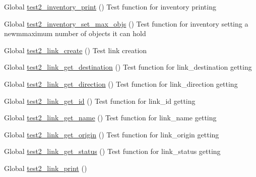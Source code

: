 \begin{DoxyRefList}
\item[Global \mbox{\hyperlink{inventory__test_8c_ab416dcaf2ae0f9852a8c6ed5eea4f408}{test2\+\_\+inventory\+\_\+print}} ()]\label{test__test000439}%
%
Test function for inventory printing  
\item[Global \mbox{\hyperlink{inventory__test_8c_a64fb028724693b382de7a1d9d61604e1}{test2\+\_\+inventory\+\_\+set\+\_\+max\+\_\+objs}} ()]\label{test__test000445}%
%
Test function for inventory setting a newmmaximum number of objects it can hold  
\item[Global \mbox{\hyperlink{link__test_8c_a24b5463da176c3e578b0a0fa8bb1f9f0}{test2\+\_\+link\+\_\+create}} ()]\label{test__test000447}%
%
Test link creation  
\item[Global \mbox{\hyperlink{link__test_8c_a8db6596d19305a9814a963a81d0d32d9}{test2\+\_\+link\+\_\+get\+\_\+destination}} ()]\label{test__test000465}%
%
Test function for link\+\_\+destination getting  
\item[Global \mbox{\hyperlink{link__test_8c_a63dbcd55ed0913dea30eba35884b5558}{test2\+\_\+link\+\_\+get\+\_\+direction}} ()]\label{test__test000467}%
%
Test function for link\+\_\+direction getting  
\item[Global \mbox{\hyperlink{link__test_8c_a0f967a1782dd7264e73ad428d22d125d}{test2\+\_\+link\+\_\+get\+\_\+id}} ()]\label{test__test000450}%
%
Test function for link\+\_\+id getting  
\item[Global \mbox{\hyperlink{link__test_8c_a4efc6cfcdc210e2803f9d285734c571e}{test2\+\_\+link\+\_\+get\+\_\+name}} ()]\label{test__test000452}%
%
Test function for link\+\_\+name getting  
\item[Global \mbox{\hyperlink{link__test_8c_a046f49dd5d1c36d2f385ccbc9a540e85}{test2\+\_\+link\+\_\+get\+\_\+origin}} ()]\label{test__test000460}%
%
Test function for link\+\_\+origin getting  
\item[Global \mbox{\hyperlink{link__test_8c_a7d1062febd832b21e69df5f071425b4c}{test2\+\_\+link\+\_\+get\+\_\+status}} ()]\label{test__test000472}%
%
Test function for link\+\_\+status getting  
\item[Global \mbox{\hyperlink{link__test_8c_ad749dc76d3a04b2860e30dc6667b138a}{test2\+\_\+link\+\_\+print}} ()]\label{test__test000477}%
%

\end{DoxyRefList}
